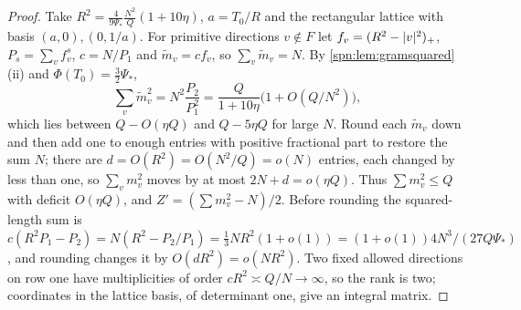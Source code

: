 \begin{proof}
Take $R^2=\frac4{9\Psi_*}\frac{N^2}Q(1+10\eta)$, $a=T_0/R$ and the rectangular lattice with basis $(a,0),(0,1/a)$.
For primitive directions $v\notin F$ let $f_v=(R^2-\lvert v\rvert^2)_+$, $P_s=\sum_vf_v^s$, $c=N/P_1$ and
$\tilde m_v=cf_v$, so $\sum_v\tilde m_v=N$. By \cref{spn:lem:gramsquared}(ii) and $\Phi(T_0)=\frac32\Psi_*$,
\[
 \sum_v\tilde m_v^2=N^2\frac{P_2}{P_1^2}=\frac Q{1+10\eta}\bigl(1+O(Q/N^2)\bigr),
\]
which lies between $Q-O(\eta Q)$ and $Q-5\eta Q$ for large $N$. Round each $\tilde m_v$ down and then add one to
enough entries with positive fractional part to restore the sum $N$; there are $d=O(R^2)=O(N^2/Q)=o(N)$ entries,
each changed by less than one, so $\sum_vm_v^2$ moves by at most $2N+d=o(\eta Q)$. Thus $\sum m_v^2\le Q$ with deficit
$O(\eta Q)$, and $Z'=(\sum m_v^2-N)/2$. Before rounding the squared-length sum is
$c(R^2P_1-P_2)=N(R^2-P_2/P_1)=\frac13NR^2(1+o(1))=(1+o(1))4N^3/(27Q\Psi_*)$, and rounding changes it by
$O(dR^2)=o(NR^2)$. Two fixed allowed directions on row one have multiplicities of order $cR^2\asymp Q/N\to\infty$, so
the rank is two; coordinates in the lattice basis, of determinant one, give an integral matrix.
\end{proof}

